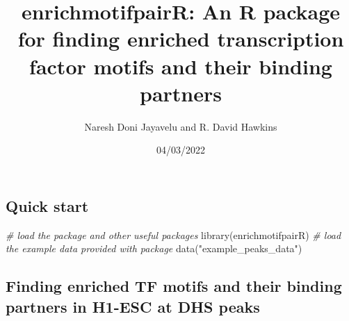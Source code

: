 \documentclass[
]{article}
\title{enrichmotifpairR: An R package for finding enriched transcription
factor motifs and their binding partners}
\author{Naresh Doni Jayavelu and R. David Hawkins}
\date{04/03/2022}
\newenvironment{Shaded}{}{}
\newcommand{\AttributeTok}[1]{\textcolor[rgb]{0.49,0.56,0.16}{#1}}
\newcommand{\CommentTok}[1]{\textcolor[rgb]{0.38,0.63,0.69}{\textit{#1}}}
\newcommand{\FloatTok}[1]{\textcolor[rgb]{0.25,0.63,0.44}{#1}}
\newcommand{\FunctionTok}[1]{\textcolor[rgb]{0.02,0.16,0.49}{#1}}
\newcommand{\NormalTok}[1]{#1}
\newcommand{\OtherTok}[1]{\textcolor[rgb]{0.00,0.44,0.13}{#1}}
\newcommand{\SpecialCharTok}[1]{\textcolor[rgb]{0.25,0.44,0.63}{#1}}
\newcommand{\StringTok}[1]{\textcolor[rgb]{0.25,0.44,0.63}{#1}}
\begin{document}
\maketitle

{
\setcounter{tocdepth}{2}
\tableofcontents
}
\hypertarget{quick-start}{%
\subsection{Quick start}\label{quick-start}}

\begin{Shaded}
\begin{Highlighting}[]
\CommentTok{\# load the package and other useful packages}
\FunctionTok{library}\NormalTok{(enrichmotifpairR)}
\CommentTok{\# load the example data provided with package}
\FunctionTok{data}\NormalTok{(}\StringTok{"example\_peaks\_data"}\NormalTok{)}
\end{Highlighting}
\end{Shaded}

\hypertarget{finding-enriched-tf-motifs-and-their-binding-partners-in-h1-esc-at-dhs-peaks}{%
\subsection{Finding enriched TF motifs and their binding partners in
H1-ESC at DHS
peaks}\label{finding-enriched-tf-motifs-and-their-binding-partners-in-h1-esc-at-dhs-peaks}}

\begin{Shaded}
\end{Shaded}
\end{document}
